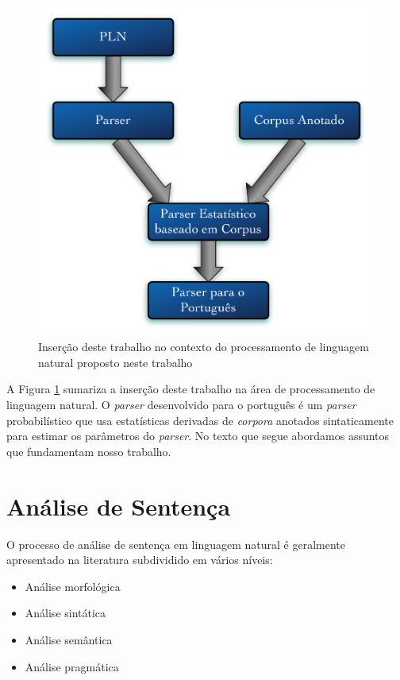 \begin{figure}
	\begin{center}
		\includegraphics[scale=0.5]{fases.pdf}
		\caption{\label{fases} Inserção deste trabalho no contexto do processamento de linguagem natural proposto neste trabalho}		
	\end{center}
\end{figure}

A Figura \ref{fases} sumariza a inserção deste trabalho na área de processamento de linguagem natural. O \emph{parser} desenvolvido para o português é um \emph{parser} probabilístico que usa estatísticas derivadas de \emph{corpora} anotados sintaticamente para estimar os parâmetros do \emph{parser}. No texto que segue abordamos assuntos que fundamentam nosso trabalho.

\section{Análise de Sentença} %
\label{sec:analise_da_sentenca}

O processo de análise de sentença em linguagem natural é geralmente apresentado na literatura subdividido em vários níveis:

\begin{itemize}
	\item Análise morfológica
	\item Análise sintática
	\item Análise semântica
	\item Análise pragmática
\end{itemize}


